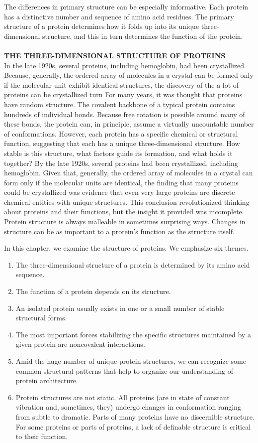 The differences in primary structure can be especially informative. Each protein has a distinctive number and sequence of amino acid residues. The primary structure of a protein determines how it folds up into its unique three-dimensional structure, and this in turn determines the function of the protein. \\
\\
\textbf{THE THREE-DIMENSIONAL STRUCTURE OF PROTEINS}\\
In the late 1920s, several proteins, including hemoglobin, had been crystallized. Because, generally, the ordered array of molecules in a crystal can be formed only if the molecular unit exhibit identical structures, the discovery of the  a lot of proteins can be crystallized turn
For many years, it was thought that proteins have random structure. 
The covalent backbone of a typical protein contains hundreds of individual bonds. 
Because free rotation is possible around many of these bonds, the protein can, in principle, assume a virtually uncountable number of conformations. 
However, each protein has a specific chemical or structural function, suggesting that each has a unique three-dimensional structure. How stable is this structure, what factors guide its formation, and what holds it together? 
By the late 1920s, several proteins had been crystallized, including hemoglobin. Given that, generally, the ordered array of molecules in a crystal can form only if the molecular units are identical, the finding that many proteins could be crystallized was evidence that even very large proteins are discrete chemical entities with unique structures. 
This conclusion revolutionized thinking about proteins and their functions, but the insight it provided was incomplete. Protein structure is always malleable in sometimes surprising ways. Changes in structure can be as important to a protein's function as the structure itself. 

In this chapter, we examine the structure of proteins. We emphasize six themes. 
\begin{enumerate}
\item The three-dimensional structure of a protein is determined by its amino acid sequence. 
\item The function of a protein depends on its structure.
\item An isolated protein usually exists in one or a small number of stable structural forms. 
\item The most important forces stabilizing the specific structures maintained by a given protein are noncovalent interactions. 
\item Amid the huge number of unique protein structures, we can recognize some common structural patterns that help to organize our understanding of protein architecture.
\item Protein structures are not static. All proteins (are in state of constant vibration and, sometimes, they) undergo changes in conformation ranging from subtle to dramatic. Parts of many proteins have no discernible structure. For some proteins or parts of proteins, a lack of definable structure is critical to their function.
\end{enumerate}

